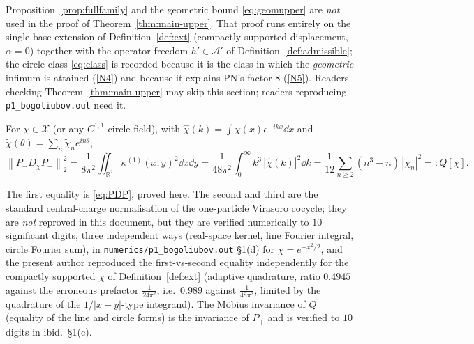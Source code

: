 \documentclass[11pt]{article}
\newcommand{\Pp}{P_+}\newcommand{\Pm}{P_-}
\newcommand{\norm}[1]{\left\lVert #1\right\rVert}\newcommand{\abs}[1]{\left|#1\right|}
\begin{document}
\begin{remark}\label{rem:notused}
Proposition~\ref{prop:fullfamily} and the geometric bound \eqref{eq:geomupper} are \emph{not} used in
the proof of Theorem~\ref{thm:main-upper}.  That proof runs entirely on the single base extension of
Definition~\ref{def:ext} (compactly supported displacement, $\alpha=0$) together with the operator
freedom $h'\in\mathcal A'$ of Definition~\ref{def:admissible}; the circle class \eqref{eq:class} is
recorded because it is the class in which the \emph{geometric} infimum is attained (\ref{N4}) and
because it explains PN's factor $8$ (\ref{N5}).  Readers checking Theorem~\ref{thm:main-upper} may
skip this section; readers reproducing \texttt{p1\_bogoliubov.out} need it.
\end{remark}

\begin{lemma}\label{lem:fourier}
For $\chi\in\mathcal X$ (or any $C^{1,1}$ circle field), with $\hat\chi(k)=\int\chi(x)e^{-ikx}\dd x$ and
$\widetilde\chi(\theta)=\sum_n\widetilde\chi_ne^{in\theta}$,
\begin{equation}\label{eq:Q}
 \norm{\Pm D_\chi\Pp}_2^2
 =\frac1{8\pi^2}\iint_{\mathbb R^2}\kappa^{(1)}(x,y)^2\dd x\dd y
 =\frac1{48\pi^2}\int_0^\infty k^3\,|\hat\chi(k)|^2\dd k
 =\frac1{12}\sum_{n\ge2}(n^3-n)\,|\widetilde\chi_n|^2 =: Q[\chi].
\end{equation}
\end{lemma}
\begin{verdictok}
The first equality is \eqref{eq:PDP}, proved here.  The second and third are the standard
central-charge normalisation of the one-particle Virasoro cocycle; they are \emph{not} reproved in
this document, but they are verified numerically to $10$ significant digits, three independent ways
(real-space kernel, line Fourier integral, circle Fourier sum), in
\texttt{numerics/p1\_bogoliubov.out} \S1(d) for $\chi=e^{-x^2/2}$, and the present author reproduced
the first-vs-second equality independently for the compactly supported $\chi$ of
Definition~\ref{def:ext} (adaptive quadrature, ratio $0.4945$ against the erroneous prefactor
$\frac1{24\pi^2}$, i.e.\ $0.989$ against $\frac1{48\pi^2}$, limited by the quadrature of the
$1/|x-y|$-type integrand).  The M\"obius invariance of $Q$ (equality of the line and circle forms) is
the invariance of $\Pp$ and is verified to $10$ digits in ibid.\ \S1(c).
\end{verdictok}
\end{document}

